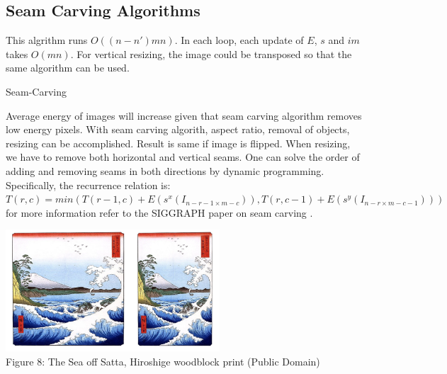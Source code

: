 \documentclass{article}
\makeatletter
\def\BState{\State\hskip-\ALG@thistlm}
\makeatother
\begin{document}
\subsection{Seam Carving Algorithms}
This algrithm runs $O((n-n')mn)$. In each loop, each update of $E$, $s$ and $im$ takes $O(mn)$. For vertical resizing, the image could be transposed so that the same algorithm can be used.
\begin{algorithm}
\caption{Seam-Carving}\label{euclid}
\end{algorithm}


Average energy of images will increase given that seam carving algorithm removes low energy pixels. With seam carving algorith, aspect ratio, removal of objects, resizing can be accomplished. Result is same if image is flipped. When resizing, we have to remove both horizontal and vertical seams. One can solve the order of adding and removing seams in both directions by dynamic programming. Specifically, the recurrence relation is: $T(r,c)=min(T(r-1,c)+E(s^x(I_{n-r-1\times m-c})),T(r,c-1)+E(s^y(I_{n-r\times m-c-1})))$ for more information refer to the SIGGRAPH paper on seam carving \cite{siggraphseamcarving}. 

\begin{center}
\includegraphics[width=8cm]{content_aware_resizing.png} \\
Figure 8: The Sea off Satta, Hiroshige woodblock print (Public Domain)
\end{center}
\end{document}
